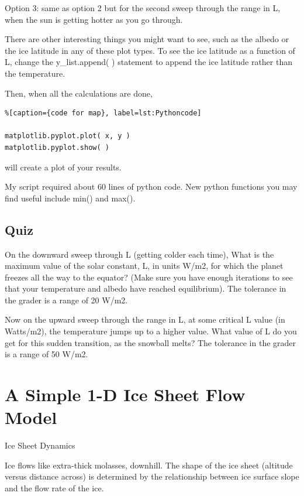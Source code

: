 {Option 3: same as option 2 but for the second sweep through the range in L, when the sun is getting hotter as you go through.

There are other interesting things you might want to see, such as the albedo or the ice latitude in any of these plot types. To see the ice latitude as a function of L, change the y_list.append( ) statement to append the ice latitude rather than the temperature.

Then, when all the calculations are done,


\begin{lstlisting}%[caption={code for map}, label=lst:Pythoncode]

matplotlib.pyplot.plot( x, y )
matplotlib.pyplot.show( )
\end{lstlisting}

will create a plot of your results.

My script required about 60 lines of python code. New python functions you may find useful include min() and max().


\subsection{Quiz}\index{}


On the downward sweep through L (getting colder each time), What is the maximum value of the solar constant, L, in units W/m2, for which the planet freezes all the way to the equator? (Make sure you have enough iterations to see that your temperature and albedo have reached equilibrium). The tolerance in the grader is a range of 20 W/m2.


Now on the upward sweep through the range in L, at some critical L value (in Watts/m2), the temperature jumps up to a higher value. What value of L do you get for this sudden transition, as the snowball melts? The tolerance in the grader is a range of 50 W/m2.



\section{A Simple 1-D Ice Sheet Flow Model}

Ice Sheet Dynamics

Ice flows like extra-thick molasses, downhill. The shape of the ice sheet (altitude versus distance across) is determined by the relationship between ice surface slope and the flow rate of the ice.


}
